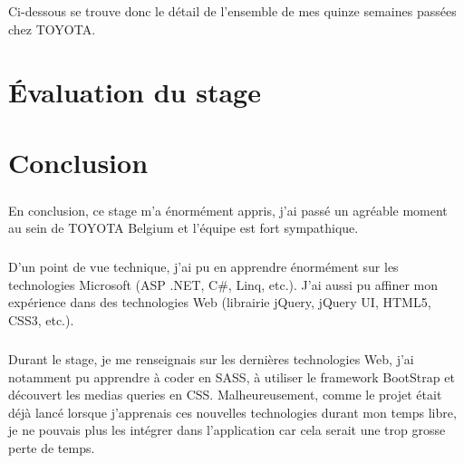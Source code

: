 \documentclass[12pt]{report}
\begin{document}
\paragraph{}
Ci-dessous se trouve donc le détail de l'ensemble de mes quinze semaines passées chez TOYOTA.
















\chapter{Évaluation du stage}

\chapter{Conclusion}
\paragraph{}
En conclusion, ce stage m'a énormément appris, j'ai passé un agréable moment au sein de TOYOTA Belgium et l'équipe est fort sympathique.
\paragraph{}
D'un point de vue technique, j'ai pu en apprendre énormément sur les technologies Microsoft (ASP .NET, C\#, Linq, etc.). J'ai aussi pu affiner mon expérience dans des technologies Web (librairie jQuery, jQuery UI, HTML5, CSS3, etc.).
\paragraph{}
Durant le stage, je me renseignais sur les dernières technologies Web, j'ai notamment pu apprendre à coder en SASS, à utiliser le framework BootStrap et découvert les medias queries en CSS. 
Malheureusement, comme le projet était déjà lancé lorsque j'apprenais ces nouvelles technologies durant mon temps libre, je ne pouvais plus les intégrer dans l'application car cela serait une trop grosse perte de temps.
\end{document}
